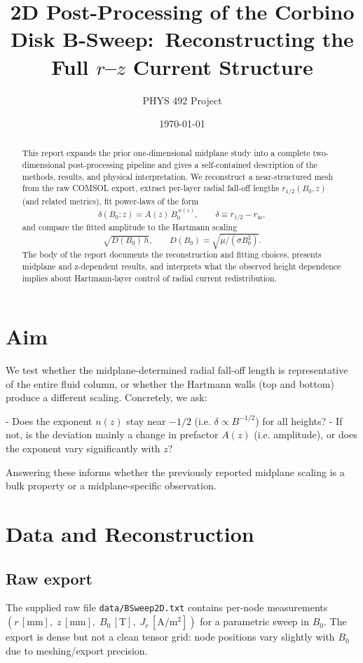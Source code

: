 \documentclass[11pt, a4paper]{article}
\title{2D Post-Processing of the Corbino Disk B-Sweep:\
    Reconstructing the Full $r$--$z$ Current Structure}
\author{PHYS 492 Project}
\date{\today}
\begin{document}
\maketitle

\begin{abstract}
This report expands the prior one-dimensional midplane study into a complete
two-dimensional post-processing pipeline and gives a self-contained description of
the methods, results, and physical interpretation. We reconstruct a near-structured
mesh from the raw COMSOL export, extract per-layer radial fall-off lengths
$r_{1/2}(B_0,z)$ (and related metrics), fit power-laws of the form
$$\delta(B_0;z) = A(z)\,B_0^{\,n(z)},\qquad \delta\equiv r_{1/2}-r_{\mathrm{in}},$$
and compare the fitted amplitude to the Hartmann scaling
$$\sqrt{D(B_0)\,h},\qquad D(B_0)=\sqrt{\mu/(\sigma B_0^2)}.$$  The body of the
report documents the reconstruction and fitting choices, presents midplane and
z-dependent results, and interprets what the observed height dependence implies
about Hartmann-layer control of radial current redistribution.
\end{abstract}

\section{Aim}
We test whether the midplane-determined radial fall-off length is representative of
the entire fluid column, or whether the Hartmann walls (top and bottom) produce a
different scaling. Concretely, we ask:

- Does the exponent $n(z)$ stay near $-1/2$ (i.e. $\delta\propto B^{-1/2}$) for
    all heights?  
- If not, is the deviation mainly a change in prefactor $A(z)$ (i.e. amplitude),
    or does the exponent vary significantly with $z$?

Answering these informs whether the previously reported midplane scaling is a
bulk property or a midplane-specific observation.

\section{Data and Reconstruction}
\subsection{Raw export}
The supplied raw file \texttt{data/BSweep2D.txt} contains per-node measurements
$(r\,[\mathrm{mm}],\;z\,[\mathrm{mm}],\;B_0\,[\mathrm{T}],\;J_r\,[\mathrm{A/m^2}])$
for a parametric sweep in $B_0$. The export is dense but not a clean tensor grid:
node positions vary slightly with $B_0$ due to meshing/export precision.  
\end{document}
